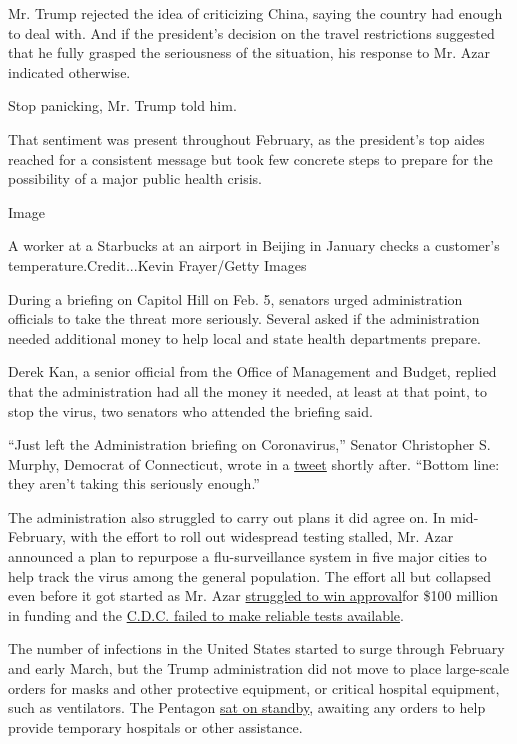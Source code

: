 Mr. Trump rejected the idea of criticizing China, saying the country had
enough to deal with. And if the president's decision on the travel
restrictions suggested that he fully grasped the seriousness of the
situation, his response to Mr. Azar indicated otherwise.

Stop panicking, Mr. Trump told him.

That sentiment was present throughout February, as the president's top
aides reached for a consistent message but took few concrete steps to
prepare for the possibility of a major public health crisis.

Image

A worker at a Starbucks at an airport in Beijing in January checks a
customer's temperature.Credit...Kevin Frayer/Getty Images

During a briefing on Capitol Hill on Feb. 5, senators urged
administration officials to take the threat more seriously. Several
asked if the administration needed additional money to help local and
state health departments prepare.

Derek Kan, a senior official from the Office of Management and Budget,
replied that the administration had all the money it needed, at least at
that point, to stop the virus, two senators who attended the briefing
said.

``Just left the Administration briefing on Coronavirus,'' Senator
Christopher S. Murphy, Democrat of Connecticut, wrote in a
\href{https://twitter.com/chrismurphyct/status/1225073987639705600?lang=en}{tweet}
shortly after. ``Bottom line: they aren't taking this seriously
enough.''

The administration also struggled to carry out plans it did agree on. In
mid-February, with the effort to roll out widespread testing stalled,
Mr. Azar announced a plan to repurpose a flu-surveillance system in five
major cities to help track the virus among the general population. The
effort all but collapsed even before it got started as Mr. Azar
\href{https://int.nyt.com/data/documenthelper/6873-2020-02-14-cdc-surveillance-fu/51b5187c0fd8b4698a50/optimized/full.pdf\#page=1}{struggled
to win approval}for \$100 million in funding and the
\href{https://www.nytimes.com/2020/03/10/us/coronavirus-testing-delays.html}{C.D.C.
failed to make reliable tests available}.

The number of infections in the United States started to surge through
February and early March, but the Trump administration did not move to
place large-scale orders for masks and other protective equipment, or
critical hospital equipment, such as ventilators. The Pentagon
\href{https://www.nytimes.com/2020/03/17/us/politics/coronavirus-government-army-corps.html}{sat
on standby}, awaiting any orders to help provide temporary hospitals or
other assistance.

